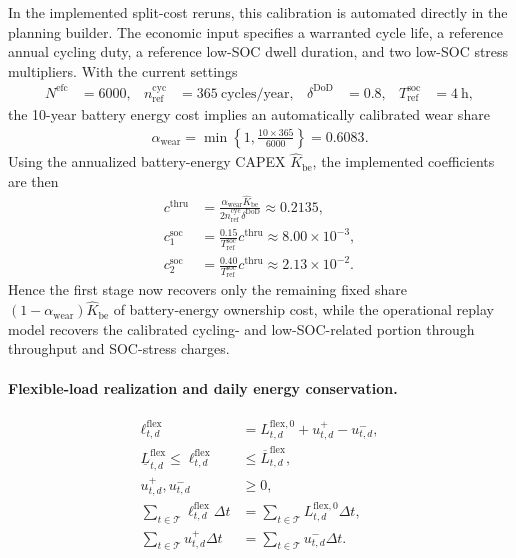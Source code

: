 In the implemented split-cost reruns, this calibration is automated directly in the planning builder. The economic input specifies a warranted cycle life, a reference annual cycling duty, a reference low-SOC dwell duration, and two low-SOC stress multipliers. With the current settings
\begin{align}
N^{\mathrm{efc}} &= 6000,
&n_{\mathrm{ref}}^{\mathrm{cyc}} &= 365~\text{cycles/year},
&\delta^{\mathrm{DoD}} &= 0.8,
&T_{\mathrm{ref}}^{\mathrm{soc}} &= 4~\text{h},
\end{align}
the 10-year battery energy cost implies an automatically calibrated wear share
\begin{align}
\alpha_{\mathrm{wear}} = \min\left\{1,\frac{10\times 365}{6000}\right\} = 0.6083.
\end{align}
Using the annualized battery-energy CAPEX \(\widehat K_{\mathrm{be}}\), the implemented coefficients are then
\begin{align}
c^{\mathrm{thru}} &= \frac{\alpha_{\mathrm{wear}}\widehat K_{\mathrm{be}}}{2 n_{\mathrm{ref}}^{\mathrm{cyc}} \delta^{\mathrm{DoD}}}
\approx 0.2135,\\
c^{\mathrm{soc}}_1 &= \frac{0.15}{T_{\mathrm{ref}}^{\mathrm{soc}}} c^{\mathrm{thru}} \approx 8.00\times 10^{-3},\\
c^{\mathrm{soc}}_2 &= \frac{0.40}{T_{\mathrm{ref}}^{\mathrm{soc}}} c^{\mathrm{thru}} \approx 2.13\times 10^{-2}.
\end{align}
Hence the first stage now recovers only the remaining fixed share \((1-\alpha_{\mathrm{wear}})\widehat K_{\mathrm{be}}\) of battery-energy ownership cost, while the operational replay model recovers the calibrated cycling- and low-SOC-related portion through throughput and SOC-stress charges.

\paragraph{Flexible-load realization and daily energy conservation.}
\begin{align}
\ell^{\mathrm{flex}}_{t,d} &= L^{\mathrm{flex},0}_{t,d} + u^+_{t,d} - u^-_{t,d},
\label{eq:10a-flex-decomposition}\\
\underline L^{\mathrm{flex}}_{t,d} \le \ell^{\mathrm{flex}}_{t,d} &\le \overline L^{\mathrm{flex}}_{t,d},
\label{eq:10a-flex-bounds}\\
u^+_{t,d},u^-_{t,d} &\ge 0,
\label{eq:10a-flex-modulation-nonnegative}\\
\sum_{t\in\mathcal{T}} \ell^{\mathrm{flex}}_{t,d}\Delta t &= \sum_{t\in\mathcal{T}} L^{\mathrm{flex},0}_{t,d}\Delta t,
\label{eq:10a-flex-energy-balance}\\
\sum_{t\in\mathcal{T}} u^+_{t,d}\Delta t &= \sum_{t\in\mathcal{T}} u^-_{t,d}\Delta t.
\label{eq:10a-flex-balanced-modulation}
\end{align}

